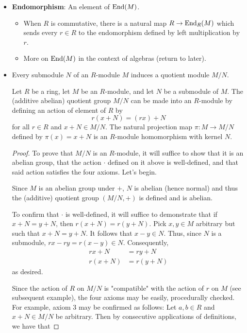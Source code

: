 \documentclass[../notes.tex]{subfiles}
\begin{document}
\begin{itemize}
    \item \textbf{Endomorphism}: An element of $\operatorname{End}(M)$.
    \begin{itemize}
        \item When $R$ is commutative, there is a natural map $R\to\operatorname{End}_R(M)$ which sends every $r\in R$ to the endomorphism defined by left multiplication by $r$.
        \item More on $\operatorname{End}(M)$ in the context of algebras (return to later).
    \end{itemize}
    \item Every submodule $N$ of an $R$-module $M$ induces a quotient module $M/N$.
    \begin{proposition}\label{prp:10.3}
        Let $R$ be a ring, let $M$ be an $R$-module, and let $N$ be a submodule of $M$. The (additive abelian) quotient group $M/N$ can be made into an $R$-module by defining an action of element of $R$ by
        \begin{equation*}
            r(x+N) = (rx)+N
        \end{equation*}
        for all $r\in R$ and $x+N\in M/N$. The natural projection map $\pi:M\to M/N$ defined by $\pi(x)=x+N$ is an $R$-module homomorphism with kernel $N$.
        \begin{proof}
            To prove that $M/N$ is an $R$-module, it will suffice to show that it is an abelian group, that the action $\cdot$ defined on it above is well-defined, and that said action satisfies the four axioms. Let's begin.\par
            Since $M$ is an abelian group under $+$, $N$ is abelian (hence normal) and thus the (additive) quotient group $(M/N,+)$ is defined and is abelian.\par
            To confirm that $\cdot$ is well-defined, it will suffice to demonstrate that if $x+N=y+N$, then $r(x+N)=r(y+N)$. Pick $x,y\in M$ arbitrary but such that $x+N=y+N$. It follows that $x-y\in N$. Thus, since $N$ is a submodule, $rx-ry=r(x-y)\in N$. Consequently,
            \begin{align*}
                rx+N &= ry+N\\
                r(x+N) &= r(y+N)
            \end{align*}
            as desired.\par
            Since the action of $R$ on $M/N$ is "compatible" with the action of $r$ on $M$ (see subsequent example), the four axioms may be easily, procedurally checked. For example, axiom 3 may be confirmed as follows: Let $a,b\in R$ and $x+N\in M/N$ be arbitrary. Then by consecutive applications of definitions, we have that

\end{proof}
\end{proposition}
\end{itemize}
\end{document}

